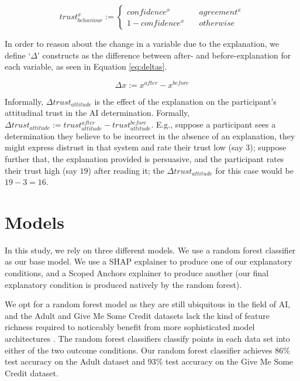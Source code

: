 \begin{equation}
    trust_{behaviour}^x := \left\{
        \begin{array}{ll}
            confidence^x & \quad agreement^x\\
            1 - confidence^x & \quad otherwise
        \end{array}
    \right.
    \label{eq:trimp}
\end{equation}

In order to reason about the change in a variable due to the explanation, we define `$\Delta$' constructs as the difference between after- and before-explanation for each variable, as seen in Equation \ref{eq:deltas}.

\begin{equation}
    \Delta x := x^{after} - x^{before}
    \label{eq:deltas}
\end{equation}

Informally, $\Delta trust_{attitude}$ is the effect of the explanation on the participant's attitudinal trust in the AI determination. Formally, $\Delta trust_{attitude} := trust_{attitude}^{after} - trust_{attitude}^{before}$. E.g., suppose a participant sees a determination they believe to be incorrect in the absence of an explanation, they might express distrust in that system and rate their trust low (say $3$); suppose further that, the explanation provided is persuasive, and the participant rates their trust high (say $19$) after reading it; the $\Delta trust_{attitude}$ for this case would be $19 - 3 = 16$.

\section{Models}\label{sec:models}
In this study, we rely on three different models. We use a random forest classifier as our base model. We use a SHAP explainer to produce one of our explanatory conditions, and a Scoped Anchors explainer to produce another (our final explanatory condition is produced natively by the random forest). 

We opt for a random forest model as they are still ubiquitous in the field of AI, and the Adult and Give Me Some Credit datasets lack the kind of feature richness required to noticeably benefit from more sophisticated model architectures \cite{Grinsztajn_Oyallon_Varoquaux_2022}. The random forest classifiers classify points in each data set into either of the two outcome conditions. Our random forest classifier achieves 86\% test accuracy on the Adult dataset and 93\% test accuracy on the Give Me Some Credit dataset.

